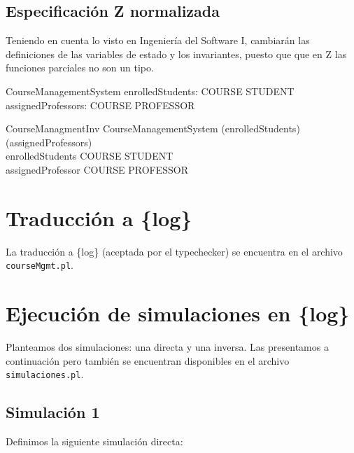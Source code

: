 \documentclass{article}
\begin{document}
\subsection*{Especificación Z normalizada}

Teniendo en cuenta lo visto en Ingeniería del Software I, cambiarán las definiciones de las variables de estado y los invariantes, puesto que que en Z las funciones parciales no son un tipo.

\begin{schema}{CourseManagementSystem}
    enrolledStudents: COURSE \rel \power STUDENT \\
    assignedProfessors: COURSE \rel \power PROFESSOR
\end{schema}

\begin{schema}{CourseManagmentInv}
CourseManagementSystem
\where
    \dom(enrolledStudents) \subseteq \dom(assignedProfessors) \\
    enrolledStudents \in COURSE \pfun \power STUDENT \\
    assignedProfessor \in COURSE \pfun PROFESSOR
\end{schema}

\section*{Traducción a \{log\}}

La traducción a \{log\} (aceptada por el typechecker) se encuentra en el archivo \verb|courseMgmt.pl|.

\section*{Ejecución de simulaciones en \{log\}}
Planteamos dos simulaciones: una directa y una inversa. Las presentamos a continuación pero también se encuentran disponibles en el archivo \verb|simulaciones.pl|.

\subsection*{Simulación 1}

Definimos la siguiente simulación directa:
\end{document}
